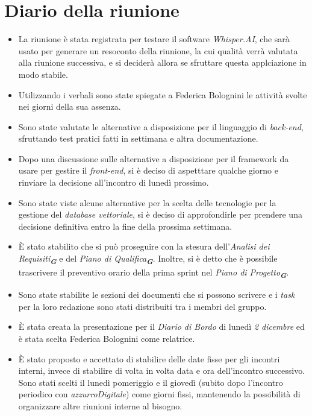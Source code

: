 
\section{Diario della riunione}

\begin{itemize}
    \item La riunione è stata registrata per testare il software \emph{Whisper.AI}, che sarà usato per generare un resoconto della riunione,
    la cui qualità verrà valutata alla riunione successiva, e si deciderà allora se sfruttare questa applciazione in modo stabile.
    \item Utilizzando i verbali sono state spiegate a Federica Bolognini le attività svolte nei giorni della sua assenza.
    \item Sono state valutate le alternative a disposizione per il linguaggio di \emph{back-end}, sfruttando test pratici fatti in settimana e altra documentazione.
    \item Dopo una discussione sulle alternative a disposizione per il framework da usare per gestire il \emph{front-end}, si è deciso di aspetttare qualche giorno e
    rinviare la decisione all'incontro di lunedì prossimo.
    \item Sono state viste alcune alternative per la scelta delle tecnologie per la gestione del \emph{database vettoriale}, 
    si è deciso di approfondirle per prendere una decisione definitiva entro la fine della prossima settimana.
    \item È stato stabilito che si può proseguire con la stesura  dell’\emph{Analisi dei Requisiti}\textsubscript{\textit{\textbf{G}}} e del \emph{Piano di Qualifica}\textsubscript{\textit{\textbf{G}}}. 
    Inoltre, si è detto che è possibile trascrivere il preventivo orario della prima sprint nel 
    \emph{Piano di Progetto}\textsubscript{\textit{\textbf{G}}}.
    \item Sono state stabilite le sezioni dei documenti che si possono scrivere e i \emph{task} per la loro redazione sono stati distribuiti tra i membri del gruppo.
    \item È stata creata la presentazione per il \emph{Diario di Bordo} di lunedì \emph{2 dicembre} ed è stata scelta Federica Bolognini come relatrice.
    \item È stato proposto e accettato di stabilire delle date fisse per gli incontri interni, invece di stabilire di volta in volta data e 
    ora dell’incontro successivo. Sono stati scelti il lunedì pomeriggio e il giovedì (subito dopo l’incontro periodico con \emph{azzurroDigitale}) 
    come giorni fissi, mantenendo la possibilità di organizzare altre riunioni interne al bisogno.
\end{itemize}
